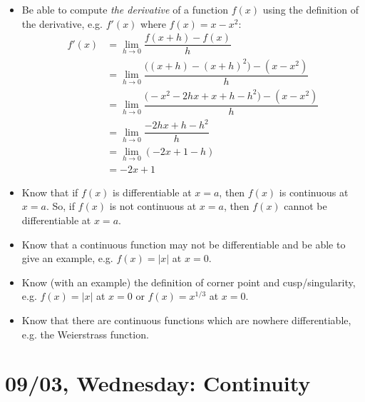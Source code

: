 \documentclass[11pt,letterpaper]{article}
\begin{document}
\begin{itemize}
\item Be able to compute \textit{the derivative} of a function $f(x)$ using the definition of the derivative, e.g. $f'(x)$ where $f(x)= x - x^2$:
	\[
	\begin{aligned}
	f'(x)&= \lim_{h \to 0} \dfrac{f(x + h) - f(x)}{h} \\
	&= \lim_{h \to 0} \dfrac{\big( (x + h) - (x + h)^2 \big) - (x - x^2)}{h} \\
	&= \lim_{h \to 0} \dfrac{\big( -x^2 - 2hx + x + h - h^2 \big) - (x - x^2)}{h} \\
	&= \lim_{h \to 0} \dfrac{-2hx + h - h^2}{h} \\
	&= \lim_{h \to 0} (-2x + 1 - h) \\
	&= -2x + 1
	\end{aligned}
	\]

\item Know that if $f(x)$ is differentiable at $x= a$, then $f(x)$ is continuous at $x= a$. So, if $f(x)$ is not continuous at $x= a$, then $f(x)$ cannot be differentiable at $x= a$. 

\item Know that a continuous function may not be differentiable and be able to give an example, e.g. $f(x)= |x|$ at $x= 0$. 

\item Know (with an example) the definition of corner point and cusp/singularity, e.g. $f(x)= |x|$ at $x= 0$ or $f(x)= x^{1/3}$ at $x= 0$. 

\item Know that there are continuous functions which are nowhere differentiable, e.g. the Weierstrass function. 
\end{itemize}

\newpage
\section*{09/03, Wednesday: Continuity\label{09-03}}
\end{document}
